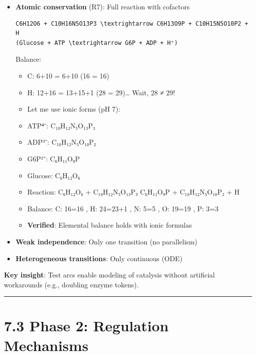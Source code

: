 \begin{itemize}
\item
  \checkmark \textbf{Atomic conservation} (R7): Full reaction with cofactors

\begin{lstlisting}
C6H12O6 + C10H16N5O13P3 \textrightarrow C6H13O9P + C10H15N5O10P2 + H
(Glucose + ATP \textrightarrow G6P + ADP + H⁺)
\end{lstlisting}

  Balance:

  \begin{itemize}
  \tightlist
  \item
    C: 6+10 = 6+10 \checkmark (16 = 16)
  \item
    H: 12+16 = 13+15+1 \checkmark (28 = 29)\ldots{} Wait, 28 ≠ 29!
  \item
    Let me use ionic forms (pH 7):
  \item
    ATP⁴⁻: C₁₀H₁₂N₅O₁₃P₃
  \item
    ADP³⁻: C₁₀H₁₂N₅O₁₀P₂
  \item
    G6P²⁻: C₆H₁₁O₉P
  \item
    Glucose: C₆H₁₂O₆
  \item
    Reaction: C₆H₁₂O₆ + C₁₀H₁₂N₅O₁₃P₃ \textrightarrow C₆H₁₁O₉P + C₁₀H₁₂N₅O₁₀P₂ + H
  \item
    Balance: C: 16=16 \checkmark, H: 24=23+1 \checkmark, N: 5=5 \checkmark, O: 19=19 \checkmark, P: 3=3 \checkmark
  \item
    \textbf{Verified}: Elemental balance holds with ionic formulas
  \end{itemize}
\item
  \textwarning \textbf{Weak independence}: Only one transition (no parallelism)
\item
  \textwarning \textbf{Heterogeneous transitions}: Only continuous (ODE)
\end{itemize}

\textbf{Key insight}: Test arcs enable modeling of catalysis without
artificial workarounds (e.g., doubling enzyme tokens).

\begin{center}\rule{0.5\linewidth}{0.5pt}\end{center}

\hypertarget{phase-2-regulation-mechanisms}{%
\section{7.3 Phase 2: Regulation
Mechanisms}\label{phase-2-regulation-mechanisms}}

